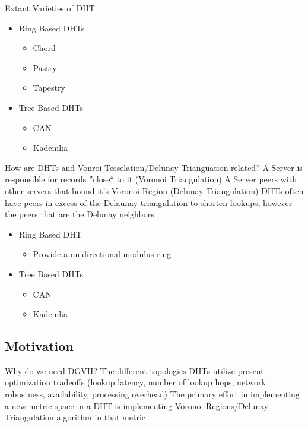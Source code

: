 \documentclass[8pt]{beamer}
\begin{document}
\begin{frame}{Extant Varieties of DHT}
	\begin{itemize}
		\item Ring Based DHTs
		\begin{itemize}
			\item Chord
			\item Pastry
			\item Tapestry
		\end{itemize}
		\item Tree Based DHTs
		\begin{itemize}
			\item CAN
			\item Kademlia
		\end{itemize}
	\end{itemize}
\end{frame}

\begin{frame}{How are DHTs and Vonroi Tesselation/Delunay Trianguation related?}
	A Server is responsible for records ''close`` to it (Voronoi Triangulation)
	A Server peers with other servers that bound it's Voronoi Region (Delunay Triangulation)
	DHTs often have peers in excess of the Delaunay triangulation to shorten lookups, however the peers that are the Delunay neighbors
	\begin{itemize}
		\item Ring Based DHT
		\begin{itemize}
			\item Provide a unidirectional modulus ring 
		\end{itemize}
		\item Tree Based DHTs
		\begin{itemize}
			\item CAN
			\item Kademlia
		\end{itemize}
	\end{itemize}
\end{frame}

	\subsection{Motivation}
\begin{frame}{Why do we need DGVH?}
	The different topologies DHTs utilize present optimization tradeoffs (lookup latency, number of lookup hops, network robustness, availability, processing overhead)
	The primary effort in implementing a new metric space in a DHT is implementing Voronoi Regions/Delunay Triangulation algorithm in that metric
\end{frame}
\end{document}
